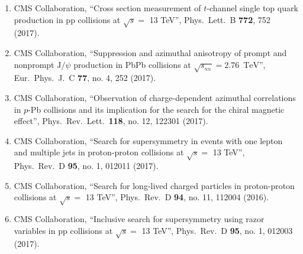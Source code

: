 \begin{enumerate}
\item CMS Collaboration, ``Cross section measurement of $t$-channel single top quark production in pp collisions at $\sqrt s =$ 13 TeV'', Phys.\ Lett.\ B {\bf 772}, 752 (2017).

\item CMS Collaboration, ``Suppression and azimuthal anisotropy of prompt and nonprompt ${\mathrm{J}}/\psi $ production in PbPb collisions at $\sqrt{{s_{_{\text {NN}}}}} =2.76$ $\,\mathrm{TeV}$'', Eur.\ Phys.\ J.\ C {\bf 77}, no. 4, 252 (2017).

\item CMS Collaboration, ``Observation of charge-dependent azimuthal correlations in $p$-Pb collisions and its implication for the search for the chiral magnetic effect'', Phys.\ Rev.\ Lett.\  {\bf 118}, no. 12, 122301 (2017).

\item CMS Collaboration, ``Search for supersymmetry in events with one lepton and multiple jets in proton-proton collisions at $\sqrt{s} =$ 13 TeV'', Phys.\ Rev.\ D {\bf 95}, no. 1, 012011 (2017).

\item CMS Collaboration, ``Search for long-lived charged particles in proton-proton collisions at $\sqrt{s}=$ 13 TeV'', Phys.\ Rev.\ D {\bf 94}, no. 11, 112004 (2016).

\item CMS Collaboration, ``Inclusive search for supersymmetry using razor variables in pp collisions at $\sqrt{s}=$ 13 TeV'', Phys.\ Rev.\ D {\bf 95}, no. 1, 012003 (2017).


\end{enumerate}
